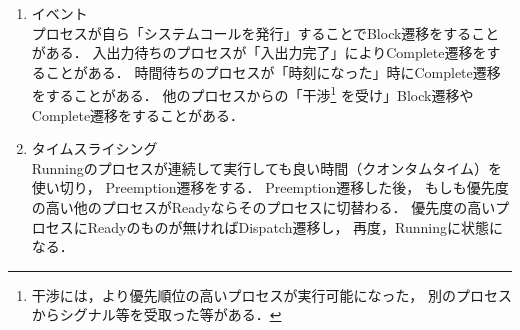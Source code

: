 \begin{enumerate}
\item イベント \\
プロセスが自ら「システムコールを発行」することでBlock遷移をすることがある．
入出力待ちのプロセスが「入出力完了」によりComplete遷移をすることがある．
時間待ちのプロセスが「時刻になった」時にComplete遷移をすることがある．
他のプロセスからの「干渉\footnote{
干渉には，より優先順位の高いプロセスが実行可能になった，
別のプロセスからシグナル等を受取った等がある．}
を受け」Block遷移やComplete遷移をすることがある．

\item タイムスライシング \\
Runningのプロセスが連続して実行しても良い時間（クオンタムタイム）を使い切り，
Preemption遷移をする．
Preemption遷移した後，
もしも優先度の高い他のプロセスがReadyならそのプロセスに切替わる．
優先度の高いプロセスにReadyのものが無ければDispatch遷移し，
再度，Runningに状態になる．
\end{enumerate}
